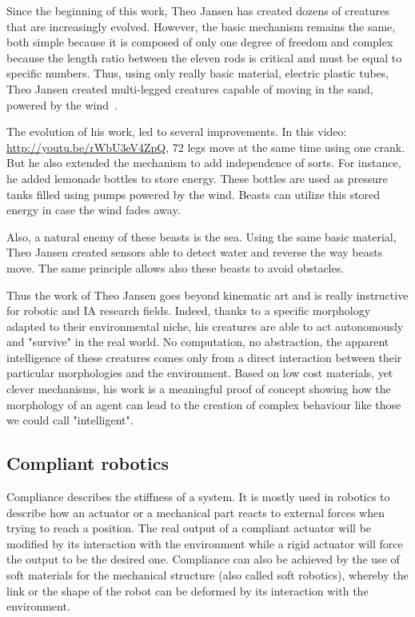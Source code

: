 Since the beginning of this work, Theo Jansen has created dozens of creatures that are increasingly evolved. However, the basic mechanism remains the same, both simple because it is composed of only one degree of freedom and complex because the length ratio between the eleven rods is critical and must be equal to specific numbers. Thus, using only really basic material, electric plastic tubes, Theo Jansen created multi-legged creatures capable of moving in the sand, powered by the wind~\parencite{jansen2007theo}.


The evolution of his work, led to several improvements. In this video: \url{http://youtu.be/rWbU3eV4ZpQ}, 72 legs move at the same time using one crank. But he also extended the mechanism to add independence of sorts. For instance, he added lemonade bottles to store energy. These bottles are used as pressure tanks filled using pumps powered by the wind. Beasts can utilize this stored energy in case the wind fades away.

Also, a natural enemy of these beasts is the sea. Using the same basic material, Theo Jansen created sensors able to detect water and reverse the way beasts move. The same principle allows also these beasts to avoid obstacles.

Thus the work of Theo Jansen goes beyond kinematic art and is really instructive for robotic and IA research fields. Indeed, thanks to a specific morphology adapted to their environmental niche, his creatures are able to act autonomously and "survive" in the real world. No computation, no abstraction, the apparent intelligence of these creatures comes only  from a direct interaction between their particular morphologies and the environment. Based on low cost materials, yet clever mechanisms, his work is a meaningful proof of concept showing how the morphology of an agent can lead to the creation of complex behaviour like those we could call "intelligent".





\subsection{Compliant robotics} %
Compliance describes the stiffness of a system. It is mostly used in robotics to describe how an actuator or a mechanical part reacts to external forces when trying to reach a position. The real output of a compliant actuator will be modified by its interaction with the environment while a rigid actuator will force the output to be the desired one. Compliance can also be achieved by the use of soft materials for the mechanical structure (also called soft robotics), whereby the link or the shape of the robot can be deformed by its interaction with the environment.

